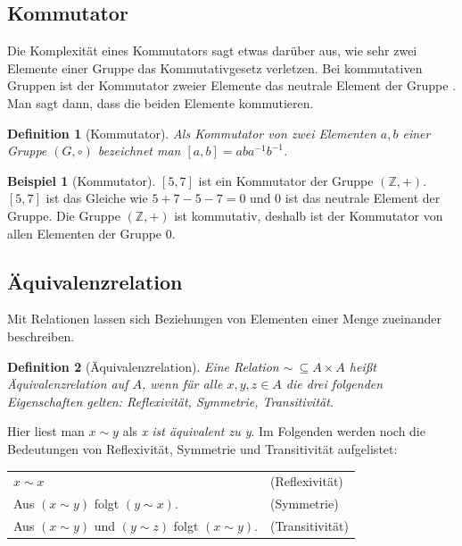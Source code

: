 \documentclass[12pt,a4paper, usenames, dvipsnames]{article}
\theoremstyle{mystyle}
\newtheorem{definition}{Definition}
\theoremstyle{definition}
\newtheorem{bsp}{Beispiel}[definition]
\begin{document}
\subsection*{Kommutator} 
Die Komplexität eines Kommutators sagt etwas darüber aus, wie sehr zwei Elemente einer Gruppe das Kommutativgesetz verletzen. Bei kommutativen Gruppen ist der Kommutator zweier Elemente das neutrale Element der Gruppe \cite{TD}. Man sagt dann, dass die beiden Elemente kommutieren. 


\begin{definition}[Kommutator]
Als Kommutator von zwei Elementen $a, b$ einer Gruppe $(G, \circ)$  bezeichnet man $[a,b] = aba^{-1}b^{-1}$.
\end{definition}


\begin{bsp}[Kommutator]

$[5,7]$ ist ein Kommutator der Gruppe $(\mathbb{Z}, +)$. $[5,7]$ ist das Gleiche wie $5+7-5-7 = 0$ und $0$ ist das neutrale Element der Gruppe. Die Gruppe $(\mathbb{Z}, +)$ ist kommutativ, deshalb ist der Kommutator von allen Elementen der Gruppe $0$.

\end{bsp}
%
%
%
%
%
%
%
%
%
%
%
%
%

\subsection*{Äquivalenzrelation} 

Mit Relationen lassen sich Beziehungen von Elementen einer Menge zueinander beschreiben.

\begin{definition}[Äquivalenzrelation]
Eine Relation $\sim \ \subseteq A \times A$ heißt Äquivalenzrelation auf $A$, wenn für alle $x, y, z \in A$ die drei folgenden Eigenschaften gelten: Reflexivität, Symmetrie, Transitivität.
\end{definition}


Hier liest man $x \sim y$ als \textit{x ist äquivalent zu y}. Im Folgenden werden noch die Bedeutungen von Reflexivität, Symmetrie und Transitivität aufgelistet:

\begin{center}
\begin{tabular}{ll}
$x \sim x$ & (Reflexivität) \\
Aus $(x \sim y)$ folgt $(y \sim x)$. & (Symmetrie) \\
Aus $(x \sim y)$ und $(y \sim z)$ folgt $(x \sim y)$. & (Transitivität) \\
\end{tabular}
\end{center}
\end{document}
